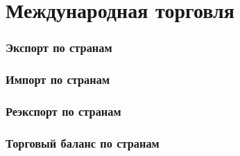 \section{Международная торговля}

\begin{frame}
    \frametitle{Экспорт по странам}
    \begin{center}
    
    \end{center}
\end{frame}

\begin{frame}
    \frametitle{Импорт по странам}
    \begin{center}
    
    \end{center}
\end{frame}

\begin{frame}
    \frametitle{Реэкспорт по странам}
    \begin{center}
    
    \end{center}
\end{frame}

\begin{frame}
    \frametitle{Торговый баланс по странам}
    \begin{center}
    
    \end{center}
\end{frame}